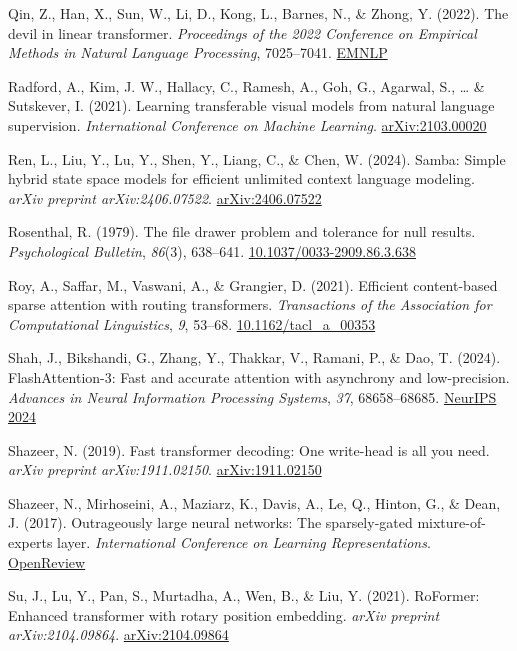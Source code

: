 \documentclass[10pt,twocolumn]{article}
\begin{document}
Qin, Z., Han, X., Sun, W., Li, D., Kong, L., Barnes, N., \& Zhong, Y. (2022). The devil in linear transformer. \emph{Proceedings of the 2022 Conference on Empirical Methods in Natural Language Processing}, 7025--7041. \href{https://aclanthology.org/2022.emnlp-main.473}{EMNLP}

Radford, A., Kim, J. W., Hallacy, C., Ramesh, A., Goh, G., Agarwal, S., \ldots{} \& Sutskever, I. (2021). Learning transferable visual models from natural language supervision. \emph{International Conference on Machine Learning}. \href{https://arxiv.org/abs/2103.00020}{arXiv:2103.00020}

Ren, L., Liu, Y., Lu, Y., Shen, Y., Liang, C., \& Chen, W. (2024). Samba: Simple hybrid state space models for efficient unlimited context language modeling. \emph{arXiv preprint arXiv:2406.07522}. \href{https://arxiv.org/abs/2406.07522}{arXiv:2406.07522}

Rosenthal, R. (1979). The file drawer problem and tolerance for null results. \emph{Psychological Bulletin}, \emph{86}(3), 638--641. \href{https://doi.org/10.1037/0033-2909.86.3.638}{10.1037/0033-2909.86.3.638}

Roy, A., Saffar, M., Vaswani, A., \& Grangier, D. (2021). Efficient content-based sparse attention with routing transformers. \emph{Transactions of the Association for Computational Linguistics}, \emph{9}, 53--68. \href{https://doi.org/10.1162/tacl_a_00353}{10.1162/tacl\_a\_00353}

Shah, J., Bikshandi, G., Zhang, Y., Thakkar, V., Ramani, P., \& Dao, T. (2024). FlashAttention-3: Fast and accurate attention with asynchrony and low-precision. \emph{Advances in Neural Information Processing Systems}, \emph{37}, 68658--68685. \href{https://proceedings.neurips.cc/paper_files/paper/2024/hash/7ede97c3e082c6df10a8d6103a2eebd2-Abstract-Conference.html}{NeurIPS 2024}

Shazeer, N. (2019). Fast transformer decoding: One write-head is all you need. \emph{arXiv preprint arXiv:1911.02150}. \href{https://arxiv.org/abs/1911.02150}{arXiv:1911.02150}

Shazeer, N., Mirhoseini, A., Maziarz, K., Davis, A., Le, Q., Hinton, G., \& Dean, J. (2017). Outrageously large neural networks: The sparsely-gated mixture-of-experts layer. \emph{International Conference on Learning Representations}. \href{https://openreview.net/forum?id=B1ckMDqlg}{OpenReview}

Su, J., Lu, Y., Pan, S., Murtadha, A., Wen, B., \& Liu, Y. (2021). RoFormer: Enhanced transformer with rotary position embedding. \emph{arXiv preprint arXiv:2104.09864}. \href{https://arxiv.org/abs/2104.09864}{arXiv:2104.09864}
\end{document}
